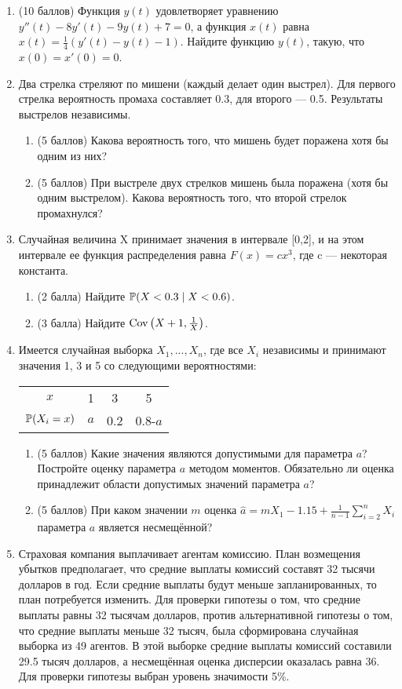 \documentclass[pdftex,12pt,a4paper]{article}
\begin{document}
\begin{enumerate}
\item (10 баллов) Функция $y(t)$ удовлетворяет уравнению $y''(t)-8y'(t)-9y(t)+7=0$, а функция $x(t)$ равна $x(t)=\frac{1}{4}(y'(t)-y(t)-1)$. Найдите функцию  $y(t)$, такую, что $x(0)=x'(0)=0$.\\
\item Два стрелка стреляют по мишени (каждый делает один выстрел). Для первого стрелка вероятность промаха составляет 0.3, для второго --- 0.5. Результаты выстрелов независимы.
\begin{enumerate}
\item (5 баллов) Какова вероятность того, что мишень будет поражена хотя бы одним из них?
\item (5 баллов) При выстреле двух стрелков мишень была поражена (хотя бы одним выстрелом). Какова вероятность того, что второй стрелок промахнулся?
\end{enumerate}
\item Случайная величина X принимает значения в интервале [0,2], и на этом интервале ее функция распределения равна $F(x)=cx^3$, где c --- некоторая константа.
\begin{enumerate}
\item (2 балла) Найдите  $\P(X<0.3\mid X<0.6)$.
\item (3 балла) Найдите $\Cov\left(X+1,\frac{1}{X}\right)$.
\end{enumerate}
\item Имеется случайная выборка $X_1,...,X_n$, где все  $X_i$ независимы и принимают значения 1, 3 и 5 со следующими вероятностями:\\
\begin{tabular}{cccc}
\hline
$x$ & 1 & 3 & 5\\
$\P(X_i=x)$ & $a$ & 0.2 & 0.8-$a$\\
\hline
\end{tabular}
 \begin{enumerate}
 \item (5 баллов) Какие значения являются допустимыми для параметра $a$? Постройте оценку параметра $a$ методом моментов. Обязательно ли оценка принадлежит области допустимых значений параметра $a$?
 \item (5 баллов) При каком значении $m$ оценка $\hat{a}=mX_1-1.15+\frac{1}{n-1}\sum_{i=2}^n X_i$ параметра $a$ является несмещённой?
 \end{enumerate}
\item Страховая компания выплачивает агентам комиссию. План возмещения убытков предполагает, что средние выплаты комиссий составят 32 тысячи долларов в год. Если средние выплаты будут меньше запланированных, то план потребуется изменить. Для проверки гипотезы о том, что средние выплаты равны 32 тысячам долларов, против альтернативной гипотезы о том, что средние выплаты меньше 32 тысяч, была сформирована случайная выборка из 49 агентов. В этой выборке средние выплаты комиссий составили 29.5 тысяч долларов, а несмещённая оценка дисперсии оказалась равна 36. Для проверки гипотезы выбран уровень значимости 5\%.

\end{enumerate}
\end{document}
